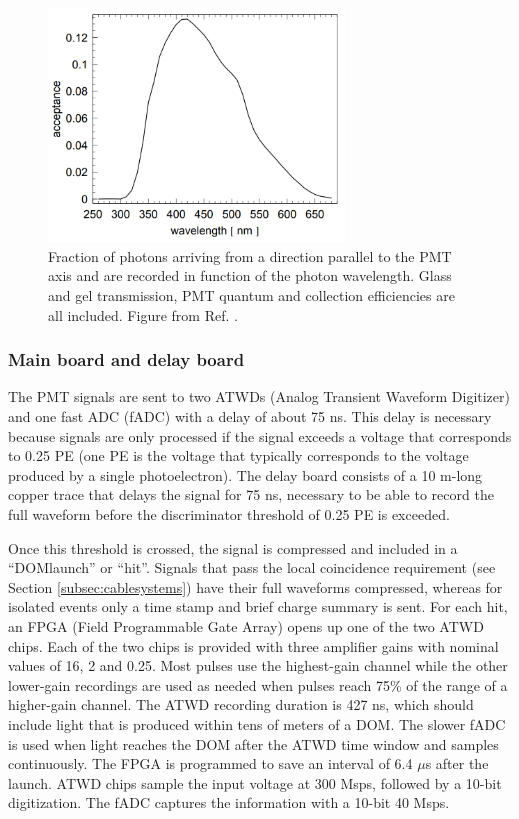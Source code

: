 \begin{figure}[t]
\centering
\includegraphics[width=0.7\textwidth]{chapter5/img/acceptanceDOM.png}
\caption{Fraction of photons arriving from a direction parallel to the PMT axis and are recorded in function of the photon wavelength. Glass and gel transmission, PMT quantum and collection efficiencies are all included. Figure from Ref. \cite{Aartsen:2013rt}.}
\label{fig:acceptance}
\end{figure}


\subsubsection{Main board and delay board}
\label{subsec:mainboard}
The PMT signals are sent to two ATWDs (Analog Transient Waveform Digitizer) and one fast ADC (fADC) with a delay of about 75 ns. This delay is necessary because signals are only processed if the signal exceeds a voltage that corresponds to 0.25 PE (one PE is the voltage that typically corresponds to the voltage produced by a single photoelectron). The delay board consists of a 10 m-long copper trace that delays the signal for 75 ns, necessary to be able to record the full waveform before the discriminator threshold of 0.25 PE is exceeded. 

Once this threshold is crossed, the signal is compressed and included in a ``DOMlaunch'' or ``hit''. Signals that pass the local coincidence requirement (see Section \ref{subsec:cablesystems}) have their full waveforms compressed, whereas for isolated events only a time stamp and brief charge summary is sent. For each hit, an FPGA  (Field Programmable Gate Array) opens up one of the two ATWD chips. Each of the two chips is provided with three amplifier gains with nominal values of 16, 2 and 0.25. Most pulses use the highest-gain channel while the other lower-gain recordings are used as needed when pulses reach 75\% of the range of a higher-gain channel. The ATWD recording duration is 427 ns, which should include light that is produced within tens of meters of a DOM. The slower fADC is used when light reaches the DOM after the ATWD time window and samples continuously. The FPGA is programmed to save an interval of 6.4 $\mu$s after the launch. ATWD chips sample the input voltage at 300 Msps, followed by a 10-bit digitization. The fADC captures the information with a 10-bit 40 Msps.

